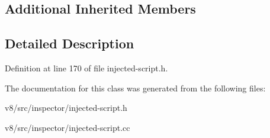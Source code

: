 \subsection*{Additional Inherited Members}


\subsection{Detailed Description}


Definition at line 170 of file injected-\/script.\+h.



The documentation for this class was generated from the following files\+:\begin{DoxyCompactItemize}
\item 
v8/src/inspector/injected-\/script.\+h\item 
v8/src/inspector/injected-\/script.\+cc\end{DoxyCompactItemize}
